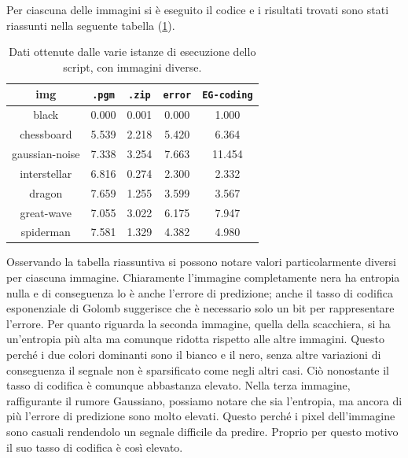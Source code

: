 \noindent Per ciascuna delle immagini si è eseguito il codice e i risultati trovati sono stati riassunti nella seguente tabella (\ref{tab:simple-conclusions}).


\begin{table}[h]
    \centering
    \renewcommand{\arraystretch}{1.5}
    \begin{tabular}{| c | c c c c |}
        \hline
        \textbf{img} & \texttt{.pgm} & \texttt{.zip} & \texttt{error} & \texttt{EG-coding} \\ \hline \hline

        black & 0.000 & 0.001 & 0.000 & 1.000 \\
        
        chessboard & 5.539 & 2.218 & 5.420 & 6.364 \\
        
        gaussian-noise & 7.338 & 3.254 & 7.663 & 11.454 \\
        
        interstellar & 6.816 & 0.274 & 2.300 & 2.332 \\
        
        dragon & 7.659 & 1.255 & 3.599 & 3.567 \\
        
        great-wave & 7.055 & 3.022 & 6.175 & 7.947 \\
        
        spiderman & 7.581 & 1.329 & 4.382 & 4.980 \\
        \hline
    \end{tabular}
    \caption{Dati ottenute dalle varie istanze di esecuzione dello script, con immagini diverse.}
    \label{tab:simple-conclusions}
    \renewcommand{\arraystretch}{1}
\end{table}

\noindent Osservando la tabella riassuntiva si possono notare valori particolarmente diversi per ciascuna immagine. Chiaramente l'immagine completamente nera ha entropia nulla e di conseguenza lo è anche l'errore di predizione; anche il tasso di codifica esponenziale di Golomb suggerisce che è  necessario solo un bit per rappresentare l'errore. Per quanto riguarda la seconda immagine, quella della scacchiera, si ha un'entropia più alta ma comunque ridotta rispetto alle altre immagini. Questo perché i due colori dominanti sono il bianco e il nero, senza altre variazioni di conseguenza il segnale non è sparsificato come negli altri casi. Ciò nonostante il tasso di codifica è comunque abbastanza elevato. Nella terza immagine, raffigurante il rumore Gaussiano, possiamo notare che sia l'entropia, ma ancora di più l'errore di predizione sono molto elevati. Questo perché i pixel dell'immagine sono casuali rendendolo un segnale difficile da predire. Proprio per questo motivo il suo tasso di codifica è così elevato.

